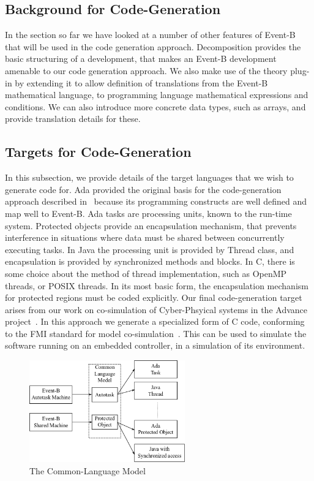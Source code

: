 \subsection{Background for Code-Generation}
In the section so far we have looked at a number of other features of Event-B that will be used in the code generation approach. Decomposition provides the basic structuring of a development, that makes an Event-B development amenable to our code generation approach. We also make use of the theory plug-in by extending it to allow definition of translations from the Event-B mathematical language, to programming language mathematical expressions and conditions. We can also introduce more concrete data types, such as arrays, and provide translation details for these. 

\subsection{Targets for Code-Generation}\label{targets}
In this subsection, we provide details of the target languages that we wish to generate code for. Ada provided the original basis for the code-generation approach described in~\cite{Edmunds2012a} because its programming constructs are well defined and map well to Event-B. Ada tasks are processing units, known to the run-time system. Protected objects provide an encapsulation mechanism, that prevents interference in situations where data must be shared between concurrently executing tasks. In Java the processing unit is provided by Thread class, and encapsulation is provided by synchronized methods and blocks. In C, there is some choice about the method of thread implementation, such as OpenMP~\cite{openmp} threads, or POSIX threads\cite{pthreads}. In its most basic form, the encapsulation mechanism for protected regions must be coded explicitly. Our final code-generation target arises from our work on co-simulation of Cyber-Phsyical systems in the Advance project~\cite{advance}. In this approach we generate a specialized form of C code, conforming to the FMI standard for model co-simulation~\cite{FMISTD}. This can be used to simulate the software running on an embedded controller, in a simulation of its environment.   
%
\begin{figure}
\centering
\includegraphics[width=0.6\textwidth]{graphics/B_IL1_others.png}
\caption{The Common-Language Model}
\label{fig:B_IL1_others}
\end{figure}

